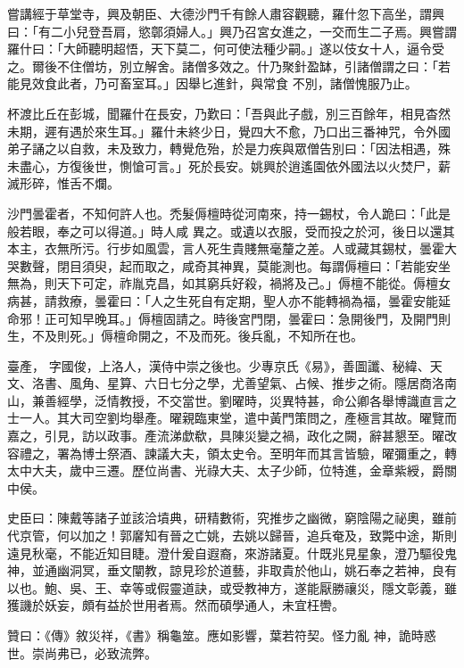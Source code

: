 \begin{pinyinscope}
 嘗講經于草堂寺，興及朝臣、大德沙門千有餘人肅容觀聽，羅什忽下高坐，謂興曰：「有二小兒登吾肩，慾鄣須婦人。」興乃召宮女進之，一交而生二子焉。興嘗謂羅什曰：「大師聽明超悟，天下莫二，何可使法種少嗣。」遂以伎女十人，逼令受之。爾後不住僧坊，別立解舍。諸僧多效之。什乃聚針盈缽，引諸僧謂之曰：「若能見效食此者，乃可畜室耳。」因舉匕進針，與常食
 不別，諸僧愧服乃止。



 杯渡比丘在彭城，聞羅什在長安，乃歎曰：「吾與此子戲，別三百餘年，相見杳然未期，遲有遇於來生耳。」羅什未終少日，覺四大不愈，乃口出三番神咒，令外國弟子誦之以自救，未及致力，轉覺危殆，於是力疾與眾僧告別曰：「因法相遇，殊未盡心，方復後世，惻愴可言。」死於長安。姚興於逍遙園依外國法以火焚尸，薪滅形碎，惟舌不爛。



 沙門曇霍者，不知何許人也。禿髮傉檀時從河南來，持一錫杖，令人跪曰：「此是般若眼，奉之可以得道。」時人咸
 異之。或遺以衣服，受而投之於河，後日以還其本主，衣無所污。行步如風雲，言人死生貴賤無毫釐之差。人或藏其錫杖，曇霍大哭數聲，閉目須臾，起而取之，咸奇其神異，莫能測也。每謂傉檀曰：「若能安坐無為，則天下可定，祚胤克昌，如其窮兵好殺，禍將及己。」傉檀不能從。傉檀女病甚，請救療，曇霍曰：「人之生死自有定期，聖人亦不能轉禍為福，曇霍安能延命邪！正可知早晚耳。」傉檀固請之。時後宮門閉，曇霍曰：急開後門，及開門則生，不及則死。」傉檀命開之，不及而死。後兵亂，不知所在也。



 臺產，
 字國俊，上洛人，漢侍中崇之後也。少專京氏《易》，善圖讖、秘緯、天文、洛書、風角、星算、六日七分之學，尤善望氣、占候、推步之術。隱居商洛南山，兼善經學，泛情教授，不交當世。劉曜時，災異特甚，命公卿各舉博識直言之士一人。其大司空劉均舉產。曜親臨東堂，遣中黃門策問之，產極言其故。曜覽而嘉之，引見，訪以政事。產流涕歔欷，具陳災變之禍，政化之闕，辭甚懇至。曜改容禮之，署為博士祭酒、諫議大夫，領太史令。至明年而其言皆驗，曜彌重之，轉太中大夫，歲中三遷。歷位尚書、光祿大夫、太子少師，位特進，金章紫綬，爵關中侯。



 史臣曰：陳戴等諸子並該洽墳典，研精數術，究推步之幽微，窮陰陽之祕奧，雖前代京管，何以加之！郭黁知有晉之亡姚，去姚以歸晉，追兵奄及，致斃中途，斯則遠見秋毫，不能近知目睫。澄什爰自遐裔，來游諸夏。什既兆見星象，澄乃驅役鬼神，並通幽洞冥，垂文闡教，諒見珍於道藝，非取貴於他山，姚石奉之若神，良有以也。鮑、吳、王、幸等或假靈道訣，或受教神方，遂能厭勝禳災，隱文彰義，雖獲譏於妖妄，頗有益於世用者焉。然而碩學通人，未宜枉轡。



 贊曰：《傳》敘災祥，《書》稱龜筮。應如影響，葉若符契。怪力亂
 神，詭時惑世。崇尚弗已，必致流弊。



\end{pinyinscope}
